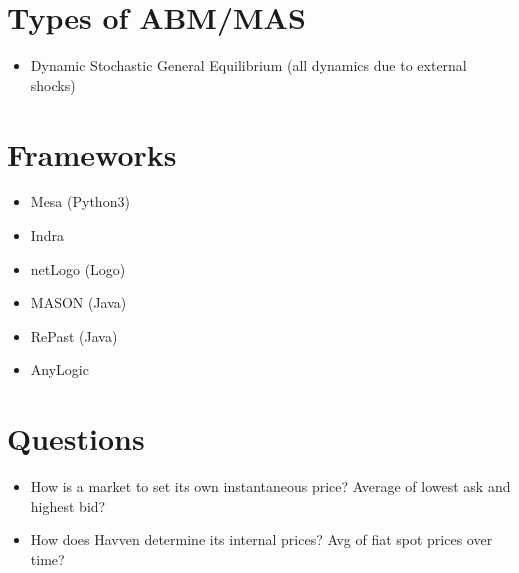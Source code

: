 \documentclass{article}
\begin{document}
\section{Types of ABM/MAS}
\begin{itemize}
    \item Dynamic Stochastic General Equilibrium (all dynamics due to external shocks)
\end{itemize}

\section{Frameworks}

\begin{itemize}
    \item Mesa (Python3)
    \item Indra
    \item netLogo (Logo)
    \item MASON (Java)
    \item RePast (Java)
    \item AnyLogic
\end{itemize}

\section{Questions}

\begin{itemize}
    \item How is a market to set its own instantaneous price? Average of lowest ask and highest bid?
    \item How does Havven determine its internal prices? Avg of fiat spot prices over time?
\end{itemize}
\end{document}
